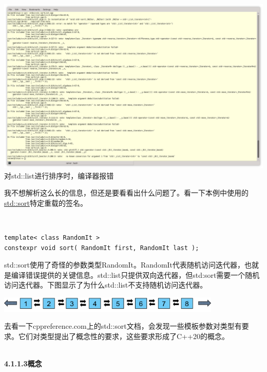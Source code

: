 \begin{center}
\includegraphics[width=1.0\textwidth]{content/3/chapter4/images/4.png}\\
对std::list进行排序时，编译器报错
\end{center}

我不想解析这么长的信息，但还是要看看出什么问题了。看一下本例中使用的\href{https://en.cppreference.com/w/cpp/algorithm/sort}{std::sort}特定重载的签名。

\hspace*{\fill} \\ %
\begin{lstlisting}[style=styleCXX]
template< class RandomIt >
constexpr void sort( RandomIt first, RandomIt last );
\end{lstlisting}

std::sort使用了奇怪的参数类型RandomIt。RandomIt代表随机访问迭代器，也就是编译错误提供的关键信息。std::list只提供双向迭代器，但std:sort需要一个随机访问迭代器。下图显示了为什么std::list不支持随机访问迭代器。

\begin{center}
\includegraphics[width=0.8\textwidth]{content/3/chapter4/images/5.png}\\
\end{center}

去看一下cppreference.com上的std::sort文档，会发现一些模板参数对类型有要求。它们对类型提出了概念性的要求，这些要求形成了C++20的概念。

\hspace*{\fill} \\ %
\noindent
\textbf{4.1.1.3\hspace{0.2cm}概念}

